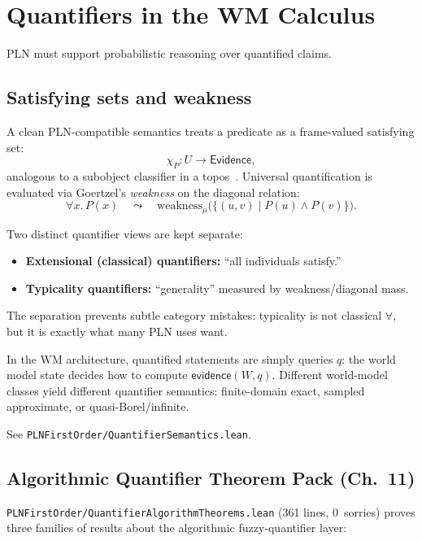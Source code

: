 \documentclass[]{article}
\newcommand{\code}[1]{\texttt{#1}}
\newcommand{\Evidence}{\mathsf{Evidence}}
\newcommand{\ev}{\mathsf{evidence}}
\begin{document}
\section{Quantifiers in the WM Calculus}
\label{sec:quantifiers}

PLN must support probabilistic reasoning over quantified claims.

\subsection{Satisfying sets and weakness}

A clean PLN-compatible semantics treats a predicate as a frame-valued
satisfying set:
\[
  \chi_P : U \to \Evidence,
\]
analogous to a subobject classifier in a
topos~\cite{MacLaneMoerdijk1992}. Universal quantification is evaluated
via Goertzel's \emph{weakness} on the diagonal relation:
\[
  \forall x.\,P(x)
  \quad\leadsto\quad
  \mathrm{weakness}_\mu\big(\{(u,v)\mid P(u)\wedge P(v)\}\big).
\]

Two distinct quantifier views are kept separate:
\begin{itemize}[leftmargin=2em]
\item \textbf{Extensional (classical) quantifiers:} ``all individuals satisfy.''
\item \textbf{Typicality quantifiers:} ``generality'' measured by
  weakness/diagonal mass.
\end{itemize}

The separation prevents subtle category mistakes: typicality is not
classical $\forall$, but it is exactly what many PLN uses want.

In the WM architecture, quantified statements are simply queries $q$: the
world model state decides how to compute $\ev(W,q)$. Different
world-model classes yield different quantifier semantics: finite-domain
exact, sampled approximate, or quasi-Borel/infinite.

See \code{PLNFirstOrder/QuantifierSemantics.lean}.

\subsection{Algorithmic Quantifier Theorem Pack (Ch.~11)}

\code{PLNFirstOrder/QuantifierAlgorithmTheorems.lean} (361 lines, 0~sorries)
proves three families of results about the algorithmic fuzzy-quantifier
layer:
\end{document}
